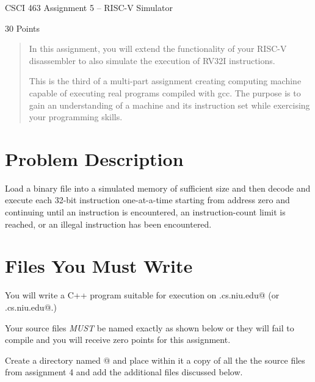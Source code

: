 \documentclass{article}
\newcommand\MyTitle{CSCI 463 Assignment 5 -- RISC-V Simulator}
\begin{document}
 
\thispagestyle{plain}
\centerline{\huge\MyTitle}
\vspace{.2in}
\centerline{30 Points}

\begin{abstract}
\noindent In this assignment, you will extend the functionality of your 
RISC-V disassembler to also simulate the execution of RV32I instructions.

This is the third of a multi-part assignment creating computing machine 
capable of executing real programs compiled with gcc.  
The purpose is to gain an understanding of a machine and its instruction set
while exercising your programming skills.
\end{abstract}

\section{Problem Description}

Load a binary file into a simulated memory of sufficient 
size and then decode and execute each 32-bit instruction one-at-a-time
starting from address zero and continuing until an \verb@ebreak@ instruction 
is encountered, an instruction-count limit is reached, or an illegal 
instruction has been encountered.

\section{Files You Must Write}

You will write a C++ program suitable for execution on 
\verb@hopper.cs.niu.edu@ (or \verb@turing.cs.niu.edu@.)

Your source files {\em MUST} be named exactly as shown below or they will 
fail to compile and you will receive zero points for this assignment.

Create a directory named @ and place within it a copy of all the
the source files from assignment 4 and add the additional files discussed below.
\end{document}
